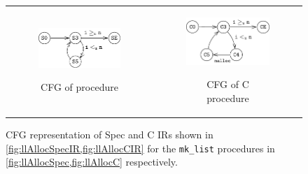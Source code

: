 \begin{figure}
\begin{tabular}{@{}c@{}c@{}}
\begin{subfigure}[b]{0.5\textwidth}
\begin{center}
{\includegraphics[scale=1.4]{chapters/figures/figMallocSpecCfg.pdf}}
\vspace{15pt}
\end{center}
\caption{\label{fig:llAllocSpecIRCFG}CFG of \SpecL{} procedure}
\end{subfigure}%
&
\begin{subfigure}[b]{0.5\textwidth}
\begin{center}
{\includegraphics[scale=1.4]{chapters/figures/figMallocCCfg.pdf}}
\end{center}
\caption{\label{fig:llAllocCCFG}CFG of C procedure}
\end{subfigure}%
\\
\end{tabular}
\caption{\label{fig:mallocSpecCFGAndCCFG}CFG representation of Spec and C IRs shown in \cref{fig:llAllocSpecIR,fig:llAllocCIR} for the {\tt mk\_list} procedures in \cref{fig:llAllocSpec,fig:llAllocC} respectively.}
\end{figure}
